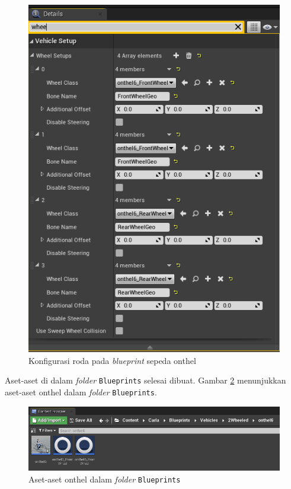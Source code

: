 \begin{figure}[!h]
    \centering
    \includegraphics[width=1\textwidth]{resources/chapter-4/onthel-blueprint-wheels.png}
    \caption{Konfigurasi roda pada \textit{blueprint} sepeda onthel}
    \label{fig:onthel-blueprint-wheels}
\end{figure}

Aset-aset di dalam \textit{folder} \verb|Blueprints| selesai dibuat. Gambar
\ref{fig:onthel-assets-in-blueprints-folder} menunjukkan aset-aset onthel dalam
\textit{folder} \verb|Blueprints|.

\begin{figure}[!h]
    \centering
    \includegraphics[width=1\textwidth]{resources/chapter-4/onthel-assets-in-blueprints-folder.png}
    \caption{Aset-aset onthel dalam \textit{folder} \texttt{Blueprints}}
    \label{fig:onthel-assets-in-blueprints-folder}
\end{figure}

